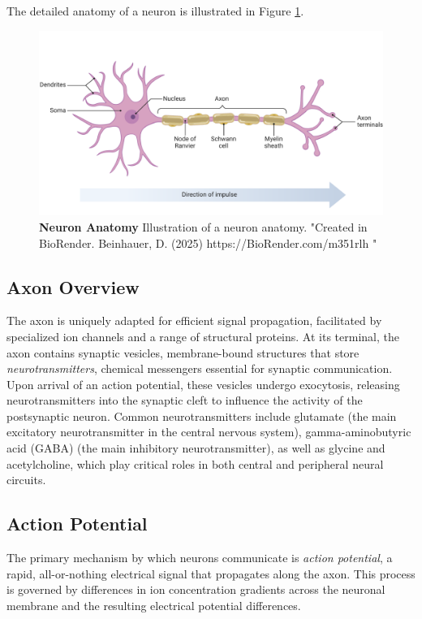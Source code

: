 The detailed anatomy of a neuron is illustrated in Figure \ref{fig:neuron}.

\begin{figure}
    \centering
    \includegraphics[width=\linewidth]{img/neuron_anatomy.pdf}
    \caption{\textbf{Neuron Anatomy} Illustration of a neuron anatomy. 
    "Created in BioRender. Beinhauer, D. (2025) https://BioRender.com/m351rlh "}
    \label{fig:neuron}
\end{figure}


\subsection{Axon Overview}
\label{subsec:axon}

The axon is uniquely adapted for efficient signal propagation, facilitated by specialized
ion channels and a range of structural proteins. At its terminal, the axon contains
synaptic vesicles, membrane-bound structures that store \emph{neurotransmitters}, chemical messengers
essential for synaptic communication. Upon arrival of an action potential, these vesicles
undergo exocytosis, releasing neurotransmitters into the synaptic cleft to influence the
activity of the postsynaptic neuron. Common neurotransmitters include glutamate (the main excitatory neurotransmitter in the central nervous system), 
gamma-aminobutyric acid (GABA) (the main inhibitory neurotransmitter),
as well as glycine and acetylcholine, which play critical roles in both central and
peripheral neural circuits.

\subsection{Action Potential}
\label{subsec:action_potential}
The primary mechanism by which neurons communicate is \emph{action potential}, a rapid, 
all-or-nothing electrical signal that propagates along the axon. This process is governed
by differences in ion concentration gradients across the neuronal membrane and the resulting
electrical potential differences.

